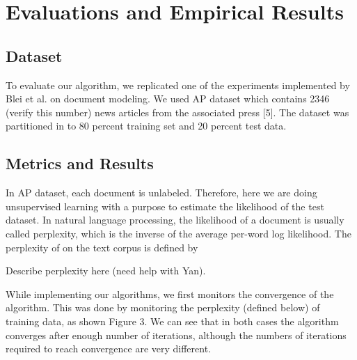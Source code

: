\documentclass{article} %
\begin{document}
\section{Evaluations and Empirical Results}
\subsection{Dataset}
To evaluate our algorithm, we replicated one of the experiments implemented by Blei et al. on document modeling. We used AP dataset which contains 2346 (verify this number) news articles from the associated press [5]. The dataset was partitioned in to 80 percent training set and 20 percent test data. 

\subsection{Metrics and Results}
In AP dataset, each document is unlabeled. Therefore, here we are doing unsupervised learning with a purpose to estimate the likelihood of the test dataset. In natural language processing, the likelihood of a document is usually called perplexity, which is the inverse of the average per-word log likelihood. The perplexity of on the text corpus is defined by 

Describe perplexity here (need help with Yan).

While implementing our algorithms, we first monitors the convergence of the algorithm. This was done by monitoring the perplexity (defined below) of training data, as shown Figure 3. We can see that in both cases the algorithm converges after enough number of iterations, although the numbers of iterations required to reach convergence are very different.
\end{document}
